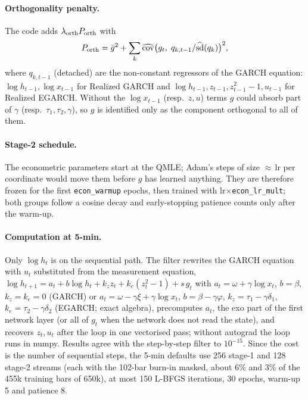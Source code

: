 \documentclass[11pt]{article}
\begin{document}
\paragraph{Orthogonality penalty.} The code adds $\lambda_{\rm orth}P_{\rm orth}$ with
\begin{equation}\label{eq:pinn-orth}
P_{\rm orth}=\bar g^2+\sum_{k}\widehat{\operatorname{cov}}\big(g_t,\;q_{k,t-1}/\widehat{\rm sd}(q_k)\big)^2,
\end{equation}
where $q_{k,t-1}$ (detached) are the non-constant regressors of the GARCH equation:
$\log h_{t-1},\log x_{t-1}$ for Realized GARCH and $\log h_{t-1},z_{t-1},z_{t-1}^2-1,u_{t-1}$ for
Realized EGARCH. Without the $\log x_{t-1}$ (resp.\ $z,u$) terms $g$ could absorb part of $\gamma$
(resp.\ $\tau_1,\tau_2,\gamma$), so $g$ is identified only as the component orthogonal to all of them.
\paragraph{Stage-2 schedule.} The econometric parameters start at the QMLE; Adam's steps of size
$\approx$\,lr per coordinate would move them before $g$ has learned anything. They are therefore
frozen for the first \texttt{econ\_warmup} epochs, then trained with lr$\times$\texttt{econ\_lr\_mult};
both groups follow a cosine decay and early-stopping patience counts only after the warm-up.

\paragraph{Computation at 5-min.} Only $\log h_t$ is on the sequential path. The filter rewrites
the GARCH equation with $u_t$ substituted from the measurement equation,
$\log h_{t+1}=a_t+b\log h_t+k_z z_t+k_e(z_t^2-1)+s\,g_t$ with $a_t=\omega+\gamma\log x_t$, $b=\beta$, $k_z=k_e=0$ (GARCH) or
$a_t=\omega-\gamma\xi+\gamma\log x_t$, $b=\beta-\gamma\varphi$, $k_z=\tau_1-\gamma\delta_1$,
$k_e=\tau_2-\gamma\delta_2$ (EGARCH; exact algebra), precomputes $a_t$, the exo part of the first network
layer (or all of $g_t$ when the network does not read the state), and recovers $z_t,u_t$ after
the loop in one vectorised pass; without autograd the loop runs in numpy. Results agree with
the step-by-step filter to $10^{-15}$. Since the cost is the number of sequential steps,
the 5-min defaults use 256 stage-1 and 128 stage-2 streams (each with the 102-bar burn-in
masked, about 6\% and 3\% of the 455k training bars of 650k), at most 150 L-BFGS iterations, 30 epochs, warm-up 5 and
patience 8.
\end{document}
